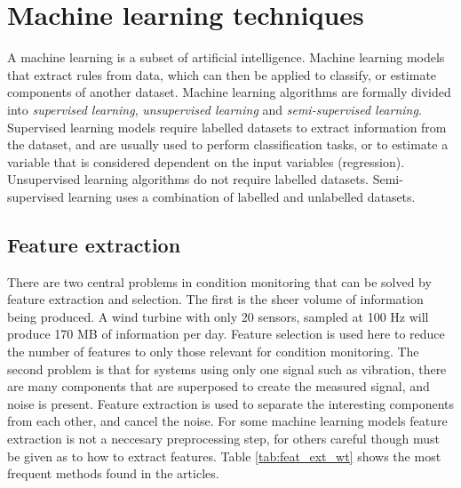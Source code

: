 \section{Machine learning techniques}
A machine learning is a subset of artificial intelligence. Machine learning models that extract rules from data, which can then be applied to classify, or estimate components of another dataset. Machine learning algorithms are formally divided into \textit{supervised learning}, \textit{unsupervised learning} and \textit{semi-supervised learning}. Supervised learning models require labelled datasets to extract information from the dataset, and are usually used to perform classification tasks, or to estimate a variable that is considered dependent on the input variables (regression). Unsupervised learning algorithms do not require labelled datasets. Semi-supervised learning uses a combination of labelled and unlabelled datasets. \bigskip

\subsection{Feature extraction}
There are two central problems in condition monitoring that can be solved by feature extraction and selection. The first is the sheer volume of information being produced. A wind turbine with only 20 sensors, sampled at 100 Hz will produce 170 MB of information per day. Feature selection is used here to reduce the number of features to only those relevant for condition monitoring. The second problem is that for systems using only one signal such as vibration, there are many components that are superposed to create the measured signal, and noise is present. Feature extraction is used to separate the interesting components from each other, and cancel the noise. For some machine learning models feature extraction is not a neccesary preprocessing step, for others careful though must be given as to how to extract features. Table \ref{tab:feat_ext_wt} shows the most frequent methods found in the articles. 

